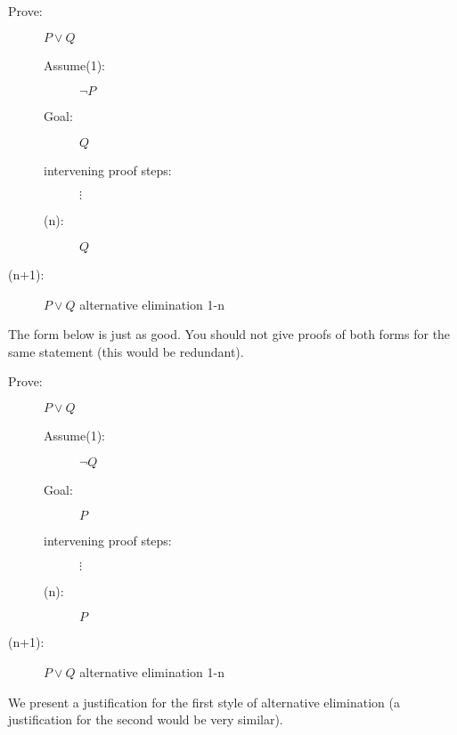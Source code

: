 \documentclass[12pt]{article}
\begin{document}
\begin{description}

\item[Prove:]  $P \vee Q$

\begin{description}


\item[Assume(1):]  $\neg P$

\item[Goal:]  $Q$

\item[intervening proof steps:]  $\vdots$

\item[(n):]  $Q$

\end{description}

\item[(n+1):]  $P \vee Q$ alternative elimination 1-n

\end{description}

The form below is just as good.  You should not give proofs of both forms for the same statement (this would be redundant).

\begin{description}

\item[Prove:]  $P \vee Q$

\begin{description}

\item[Assume(1):]  $\neg Q$

\item[Goal:]  $P$

\item[intervening proof steps:]  $\vdots$

\item[(n):]  $P$

\end{description}

\item[(n+1):]  $P \vee Q$ alternative elimination 1-n

\end{description}

We present a justification for the first style of alternative elimination (a justification for the second would be very similar).
\end{document}
